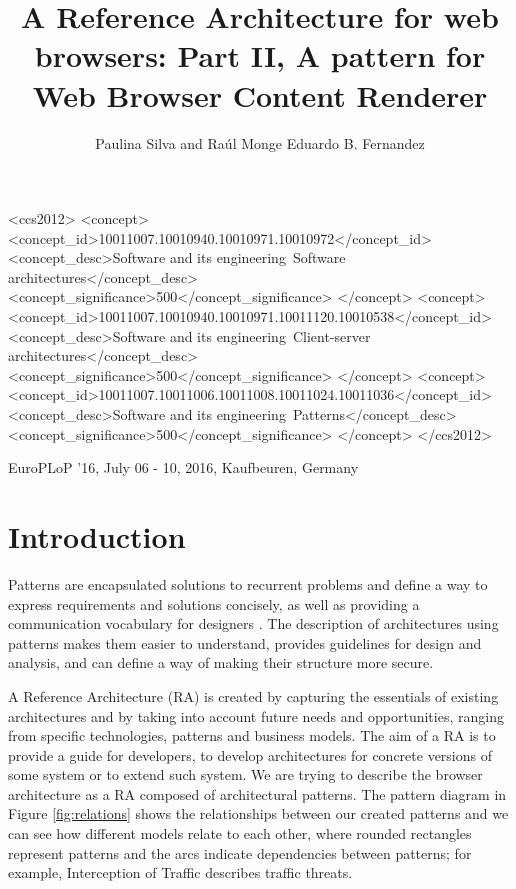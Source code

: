 \documentclass[]{acmlarge}
\title{A Reference Architecture for web browsers: Part II, A pattern for Web Browser Content Renderer}
\author{
Paulina Silva and Raúl Monge
  \affil{Universidad Técnica Federico Santa María}
Eduardo B. Fernandez
  \affil{Florida Atlantic University}
}
\begin{document}

\begin{CCSXML}
<ccs2012>
<concept>
<concept_id>10011007.10010940.10010971.10010972</concept_id>
<concept_desc>Software and its engineering~Software architectures</concept_desc>
<concept_significance>500</concept_significance>
</concept>
<concept>
<concept_id>10011007.10010940.10010971.10011120.10010538</concept_id>
<concept_desc>Software and its engineering~Client-server architectures</concept_desc>
<concept_significance>500</concept_significance>
</concept>
<concept>
<concept_id>10011007.10011006.10011008.10011024.10011036</concept_id>
<concept_desc>Software and its engineering~Patterns</concept_desc>
<concept_significance>500</concept_significance>
</concept>
</ccs2012>
\end{CCSXML}

 

\begin{bottomstuff}
EuroPLoP '16, July 06 - 10, 2016, Kaufbeuren, Germany
\end{bottomstuff}

\maketitle

\section{Introduction}
Patterns are encapsulated solutions to recurrent problems and define a way to express requirements and solutions concisely, as well as providing a communication vocabulary for designers \cite{gamma1994design,buschman1996system}. The description of architectures using patterns makes them easier to understand, provides guidelines for design and analysis, and can define a way of making their structure more secure.

A Reference Architecture (RA) is created by capturing the essentials of existing architectures and by taking into account future needs and opportunities, ranging from specific technologies, patterns and business models. The aim of a RA is to provide a guide for developers, %
to develop architectures for concrete versions of some system or to extend such system. We are trying to describe the browser architecture as a RA composed  of architectural patterns. The pattern diagram \cite{buschman1996system} in Figure \ref{fig:relations} shows the relationships between our created patterns and we can see how different models relate to each other, where rounded rectangles represent patterns and the arcs indicate dependencies between patterns; for example, Interception of Traffic describes traffic threats.
\end{document}
